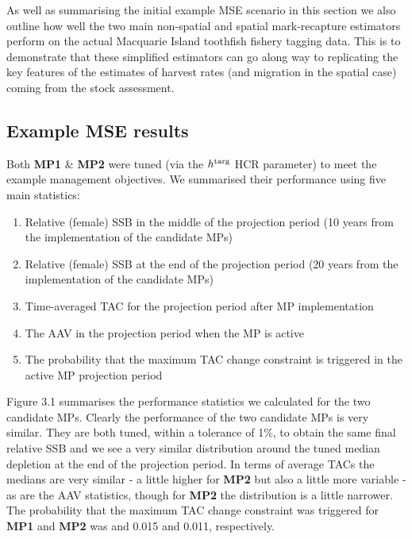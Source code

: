 \documentclass[12pt,a4paper,twoside,times,sky,standard]{csiroreport2017}
\begin{document}
As well as summarising the initial example MSE scenario in this section we also outline how well the two main non-spatial and spatial mark-recapture estimators perform on the actual Macquarie Island toothfish fishery tagging data. This is to demonstrate that these simplified estimators can go along way to replicating the key features of the estimates of harvest rates (and migration in the spatial case) coming from the stock assessment. 

\subsection{Example MSE results}

Both \textbf{MP1} \& \textbf{MP2} were tuned (via the $h^{\rm targ}$ HCR parameter) to meet the example management objectives. We summarised their performance using five main statistics:

\begin{enumerate}
    \item Relative (female) SSB in the middle of the projection period (10 years from the implementation of the candidate MPs)
    \item Relative (female) SSB at the end of the projection period (20 years from the implementation of the candidate MPs)
    \item Time-averaged TAC for the projection period after MP implementation
    \item The AAV in the projection period when the MP is active
    \item The probability that the maximum TAC change constraint is triggered in the active MP projection period
\end{enumerate}

Figure 3.1 summarises the performance statistics we calculated for the two candidate MPs. Clearly the performance of the two candidate MPs is very similar. They are both tuned, within a tolerance of 1\%, to obtain the same final relative SSB and we see a very similar distribution around the tuned median depletion at the end of the projection period. In terms of average TACs the medians are very similar - a little higher for \textbf{MP2} but also a little more variable - as are the AAV statistics, though for \textbf{MP2} the distribution is a little narrower. The probability that the maximum TAC change constraint was triggered for \textbf{MP1} and \textbf{MP2} was and 0.015 and 0.011, respectively.
\end{document}
